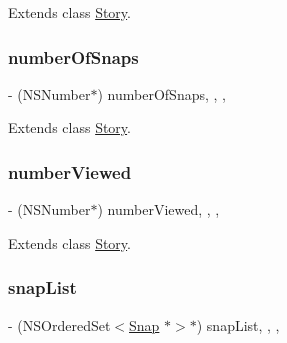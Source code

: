 Extends class \hyperlink{interface_story_a5f52fcbdeb0aabdd93d2a4312bb9759e}{Story}.

\hypertarget{category_story_07_core_data_properties_08_a274932e7cc41214730b2b9bd11b31de2}{}\label{category_story_07_core_data_properties_08_a274932e7cc41214730b2b9bd11b31de2} 
\subsubsection{\texorpdfstring{number\+Of\+Snaps}{numberOfSnaps}}
{\footnotesize\ttfamily -\/ (N\+S\+Number$\ast$) number\+Of\+Snaps\hspace{0.3cm}{\ttfamily [read]}, {\ttfamily [write]}, {\ttfamily [nonatomic]}, {\ttfamily [retain]}}



Extends class \hyperlink{interface_story_a274932e7cc41214730b2b9bd11b31de2}{Story}.

\hypertarget{category_story_07_core_data_properties_08_a5810378b61cd9f5b2b951440c8ca2db5}{}\label{category_story_07_core_data_properties_08_a5810378b61cd9f5b2b951440c8ca2db5} 
\subsubsection{\texorpdfstring{number\+Viewed}{numberViewed}}
{\footnotesize\ttfamily -\/ (N\+S\+Number$\ast$) number\+Viewed\hspace{0.3cm}{\ttfamily [read]}, {\ttfamily [write]}, {\ttfamily [nonatomic]}, {\ttfamily [retain]}}



Extends class \hyperlink{interface_story_a5810378b61cd9f5b2b951440c8ca2db5}{Story}.

\hypertarget{category_story_07_core_data_properties_08_a4616dbf24fe3c6c6f5482aea92cedd57}{}\label{category_story_07_core_data_properties_08_a4616dbf24fe3c6c6f5482aea92cedd57} 
\subsubsection{\texorpdfstring{snap\+List}{snapList}}
{\footnotesize\ttfamily -\/ (N\+S\+Ordered\+Set$<$\hyperlink{interface_snap}{Snap} $\ast$$>$$\ast$) snap\+List\hspace{0.3cm}{\ttfamily [read]}, {\ttfamily [write]}, {\ttfamily [nonatomic]}, {\ttfamily [retain]}}



